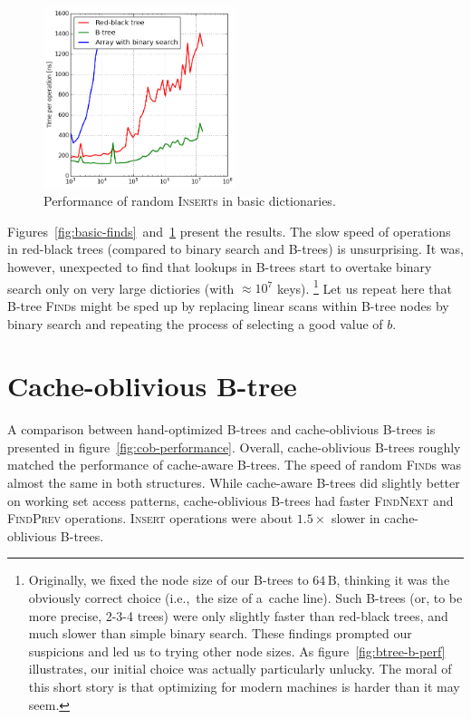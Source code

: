 \begin{figure}
\centering
\includegraphics[width=0.5\textwidth]{img/performance/basic-random-insert}
\caption{Performance of random \textsc{Insert}s in basic dictionaries.}
\label{fig:basic-perf}
\end{figure}

Figures~\ref{fig:basic-finds}~and~\ref{fig:basic-perf} present the results.
The slow speed of operations in red-black trees (compared to binary search
and B-trees) is unsurprising.
It was, however, unexpected to find that lookups in B-trees start to overtake
binary search only on very large dictiories (with $\approx10^7$ keys).
\footnote{%
	Originally, we fixed the node size of our B-trees to $64\,\text{B}$,
	thinking it was the obviously correct choice (i.e.,\ the size of
	a~cache line). Such B-trees (or, to be more precise, 2-3-4 trees)
	were only slightly faster than red-black trees, and much slower
	than simple binary search.
	These findings prompted our suspicions and led us to trying other
	node sizes.
	As figure~\ref{fig:btree-b-perf} illustrates, our initial choice
	was actually particularly unlucky.
	The moral of this short story is that optimizing for modern machines
	is harder than it may seem.
}
Let us repeat here that B-tree \textsc{Find}s might be sped up by
replacing linear scans within B-tree nodes by binary search and repeating
the process of selecting a good value of $b$.

\section{Cache-oblivious B-tree}
\label{sec:cob-perf}
A comparison between hand-optimized B-trees and cache-oblivious B-trees is
presented in figure~\ref{fig:cob-performance}. Overall, cache-oblivious
B-trees roughly matched the performance of cache-aware B-trees.
The speed of random \textsc{Find}s was almost the same in both structures.
While cache-aware B-trees did slightly better on working set access patterns,
cache-oblivious B-trees had faster \textsc{FindNext} and \textsc{FindPrev}
operations.
\textsc{Insert} operations were about $1.5\times$ slower in cache-oblivious
B-trees.

